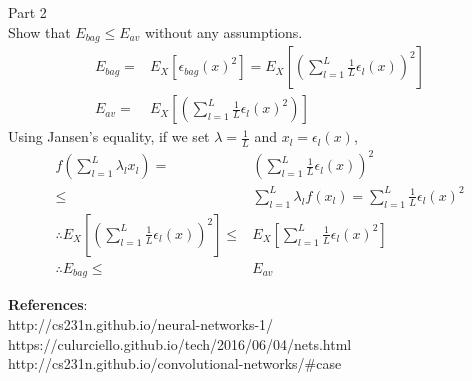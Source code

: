 \documentclass[12pt]{article}
\begin{document}
\noindent Part 2\\
\indent Show that $E_{bag} \leq E_{av}$ without any assumptions.
	\begin{align*}
	E_{bag} =& E_{X}[\epsilon_{bag}(x)^2] =E_{X}[(\sum_{l=1}^{L} \frac{1}{L} \epsilon_{l}(x))^2]\\
	E_{av} =& E_{X}[(\sum_{l=1}^{L} \frac{1}{L} \epsilon_{l}(x)^2)]
	\end{align*}
\indent \indent Using Jansen's equality, if we set $\lambda = \frac{1}{L}$ and $x_{l} = \epsilon_{l}(x)$,\\
	\begin{align*}
	f(\sum_{l=1}^{L} \lambda_{l} x_{l}) =& (\sum_{l=1}^{L} \frac{1}{L} \epsilon_{l}(x))^2\\
	\leq& \sum_{l=1}^{L} \lambda_{l} f(x_{l}) = \sum_{l=1}^{L} \frac{1}{L} \epsilon_{l}(x)^2\\
	\therefore E_{X}[(\sum_{l=1}^{L} \frac{1}{L} \epsilon_{l}(x))^2] \leq& E_{X}[\sum_{l=1}^{L} \frac{1}{L} \epsilon_{l}(x)^2]\\
	\therefore E_{bag} \leq& E_{av}
	\end{align*}
	
\noindent \textbf{References}:\\
http://cs231n.github.io/neural-networks-1/\\
https://culurciello.github.io/tech/2016/06/04/nets.html\\
http://cs231n.github.io/convolutional-networks/#case
\end{document}
